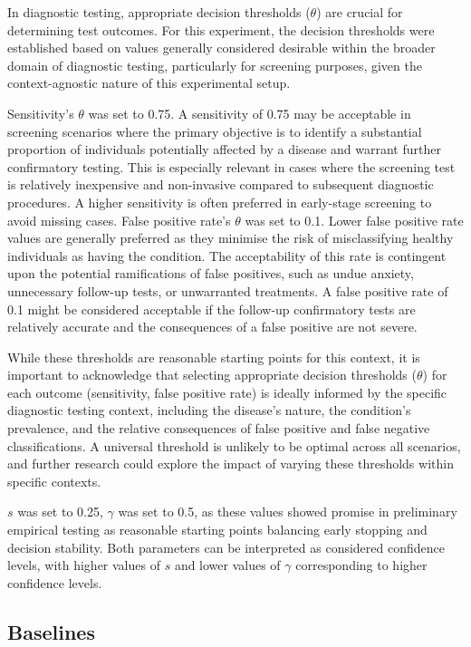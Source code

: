 \documentclass[sigconf,natbib=true,anonymous=true]{acmart}
\begin{document}
In diagnostic testing, appropriate decision thresholds ($\theta$) are crucial for determining test outcomes. For this experiment, the decision thresholds were established based on values generally considered desirable within the broader domain of diagnostic testing, particularly for screening purposes, given the context-agnostic nature of this experimental setup.

Sensitivity's $\theta$ was set to 0.75. A sensitivity of 0.75 may be acceptable in screening scenarios where the primary objective is to identify a substantial proportion of individuals potentially affected by a disease and warrant further confirmatory testing. This is especially relevant in cases where the screening test is relatively inexpensive and non-invasive compared to subsequent diagnostic procedures. A higher sensitivity is often preferred in early-stage screening to avoid missing cases.
False positive rate's $\theta$ was set to 0.1. Lower false positive rate values are generally preferred as they minimise the risk of misclassifying healthy individuals as having the condition. The acceptability of this rate is contingent upon the potential ramifications of false positives, such as undue anxiety, unnecessary follow-up tests, or unwarranted treatments. A false positive rate of 0.1 might be considered acceptable if the follow-up confirmatory tests are relatively accurate and the consequences of a false positive are not severe.


While these thresholds are reasonable starting points for this context, it is important to acknowledge that selecting appropriate decision thresholds ($\theta$) for each outcome (sensitivity, false positive rate) is ideally informed by the specific diagnostic testing context, including the disease's nature, the condition's prevalence, and the relative consequences of false positive and false negative classifications. A universal threshold is unlikely to be optimal across all scenarios, and further research could explore the impact of varying these thresholds within specific contexts.

$s$ was set to 0.25, $\gamma$ was set to 0.5, as these values showed promise in preliminary empirical testing as reasonable starting points balancing early stopping and decision stability. Both parameters can be interpreted as considered confidence levels, with higher values of $s$ and lower values of $\gamma$ corresponding to higher confidence levels. 



\subsection{Baselines}
\end{document}
